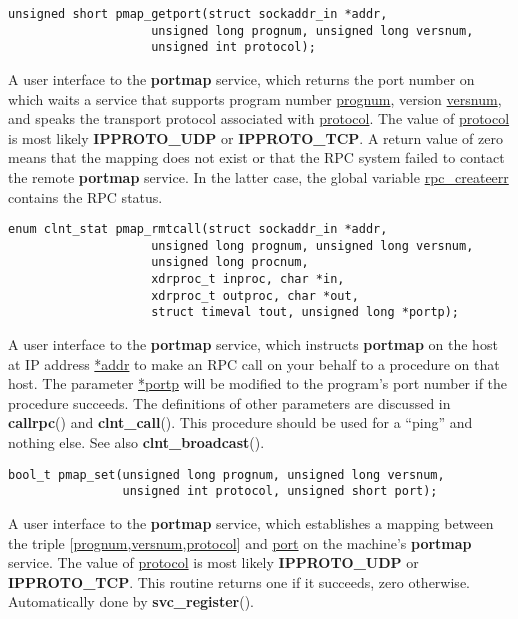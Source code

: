 \documentclass[]{article}
\let\realtextbf=\textbf
\renewcommand{\textbf}[1]{\textcolor{boldcolor}{\realtextbf{#1}}}
\renewcommand{\emph}[1]{\underline{#1}}
\begin{document}
\begin{verbatim}
unsigned short pmap_getport(struct sockaddr_in *addr,
                    unsigned long prognum, unsigned long versnum,
                    unsigned int protocol);
\end{verbatim}

\begin{description}
\itemsep1pt\parskip0pt
\item[]
A user interface to the \textbf{portmap} service, which returns the port
number on which waits a service that supports program number
\emph{prognum}, version \emph{versnum}, and speaks the transport
protocol associated with \emph{protocol}. The value of \emph{protocol}
is most likely \textbf{IPPROTO\_UDP} or \textbf{IPPROTO\_TCP}. A return
value of zero means that the mapping does not exist or that the RPC
system failed to contact the remote \textbf{portmap} service. In the
latter case, the global variable \emph{rpc\_createerr} contains the RPC
status.
\end{description}

\begin{verbatim}
enum clnt_stat pmap_rmtcall(struct sockaddr_in *addr,
                    unsigned long prognum, unsigned long versnum,
                    unsigned long procnum,
                    xdrproc_t inproc, char *in,
                    xdrproc_t outproc, char *out,
                    struct timeval tout, unsigned long *portp);
\end{verbatim}

\begin{description}
\itemsep1pt\parskip0pt
\item[]
A user interface to the \textbf{portmap} service, which instructs
\textbf{portmap} on the host at IP address \emph{*addr} to make an RPC
call on your behalf to a procedure on that host. The parameter
\emph{*portp} will be modified to the program's port number if the
procedure succeeds. The definitions of other parameters are discussed in
\textbf{callrpc}() and \textbf{clnt\_call}(). This procedure should be
used for a ``ping'' and nothing else. See also
\textbf{clnt\_broadcast}().
\end{description}

\begin{verbatim}
bool_t pmap_set(unsigned long prognum, unsigned long versnum,
                unsigned int protocol, unsigned short port);
\end{verbatim}

\begin{description}
\itemsep1pt\parskip0pt
\item[]
A user interface to the \textbf{portmap} service, which establishes a
mapping between the triple
{[}\emph{prognum},\emph{versnum},\emph{protocol}{]} and \emph{port} on
the machine's \textbf{portmap} service. The value of \emph{protocol} is
most likely \textbf{IPPROTO\_UDP} or \textbf{IPPROTO\_TCP}. This routine
returns one if it succeeds, zero otherwise. Automatically done by
\textbf{svc\_register}().
\end{description}
\end{document}
